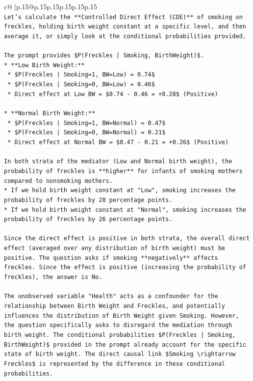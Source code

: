 \documentclass{article}
\begin{document}
{\begin{supertabular}{c@{$\;$}|p{.15\linewidth}@{}p{.15\linewidth}p{.15\linewidth}p{.15\linewidth}p{.15\linewidth}p{.15\linewidth}}
{{{\\ 
\texttt{Let's calculate the **Controlled Direct Effect (CDE)** of smoking on freckles, holding birth weight constant at a specific level, and then average it, or simply look at the conditional probabilities provided.} \\
\\ 
\texttt{The prompt provides \$P(Freckles | Smoking, BirthWeight)\$.} \\
\texttt{*   **Low Birth Weight:**} \\
\texttt{    *   \$P(Freckles | Smoking=1, BW=Low) = 0.74\$} \\
\texttt{    *   \$P(Freckles | Smoking=0, BW=Low) = 0.46\$} \\
\texttt{    *   Direct effect at Low BW = \$0.74 {-} 0.46 = +0.28\$ (Positive)} \\
\\ 
\texttt{*   **Normal Birth Weight:**} \\
\texttt{    *   \$P(Freckles | Smoking=1, BW=Normal) = 0.47\$} \\
\texttt{    *   \$P(Freckles | Smoking=0, BW=Normal) = 0.21\$} \\
\texttt{    *   Direct effect at Normal BW = \$0.47 {-} 0.21 = +0.26\$ (Positive)} \\
\\ 
\texttt{In both strata of the mediator (Low and Normal birth weight), the probability of freckles is **higher** for infants of smoking mothers compared to nonsmoking mothers.} \\
\texttt{*   If we hold birth weight constant at "Low", smoking increases the probability of freckles by 28 percentage points.} \\
\texttt{*   If we hold birth weight constant at "Normal", smoking increases the probability of freckles by 26 percentage points.} \\
\\ 
\texttt{Since the direct effect is positive in both strata, the overall direct effect (averaged over any distribution of birth weight) must be positive. The question asks if smoking **negatively** affects freckles. Since the effect is positive (increasing the probability of freckles), the answer is No.} \\
\\ 
\texttt{The unobserved variable "Health" acts as a confounder for the relationship between Birth Weight and Freckles, and potentially influences the distribution of Birth Weight given Smoking. However, the question specifically asks to disregard the mediation through birth weight. The conditional probabilities \$P(Freckles | Smoking, BirthWeight)\$ provided in the prompt already account for the specific state of birth weight. The direct causal link \$Smoking \textbackslash{}rightarrow Freckles\$ is represented by the difference in these conditional probabilities.} \\
}}}
\end{supertabular}}
\end{document}
